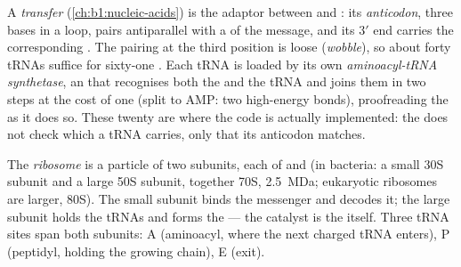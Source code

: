 \begin{definition}\label{def:b1:gene-expression:trna}
A \emph{transfer } (\cref{ch:b1:nucleic-acids}) is the adaptor
between  and : its \emph{anticodon}, three bases in a
loop, pairs antiparallel with a  of the message, and its $3'$
end carries the corresponding . The pairing at the third
 position is loose (\emph{wobble}), so about forty tRNAs suffice
for sixty-one . Each tRNA is loaded by its own
\emph{aminoacyl-tRNA synthetase}, an  that recognises both the
 and the tRNA and joins them in two steps at the cost of
one  (split to AMP: two high-energy bonds), proofreading the  as it does so. These twenty  are where the code is
actually implemented: the  does not check which  a
tRNA carries, only that its anticodon matches.
\end{definition}

\begin{definition}\label{def:b1:gene-expression:ribosome}
The \emph{ribosome} is a particle of two subunits, each of  and  (in bacteria: a small 30S subunit and a large 50S
subunit, together 70S, \qty{2.5}{MDa}; eukaryotic ribosomes are
larger, 80S). The small subunit binds the messenger and decodes it;
the large subunit holds the tRNAs and forms the  --- the
catalyst is the  itself. Three tRNA sites span both
subunits: A (aminoacyl, where the next charged tRNA enters), P
(peptidyl, holding the growing chain), E (exit).
\end{definition}

